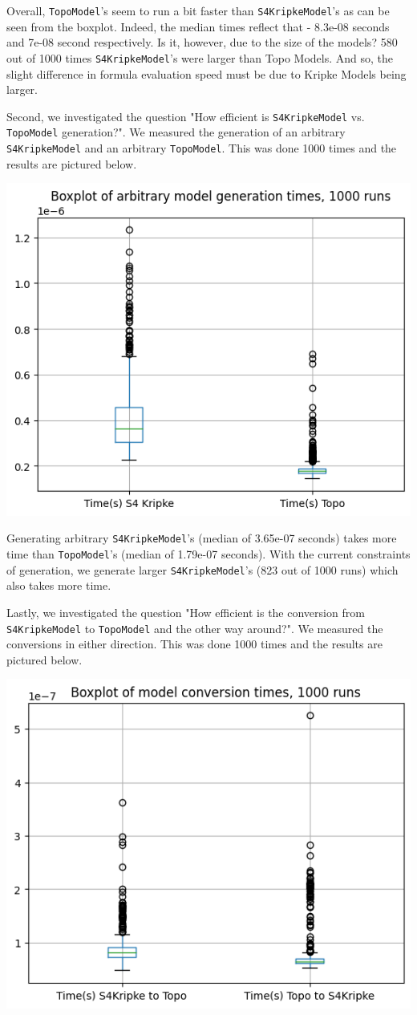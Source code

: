 \documentclass[12pt,a4paper]{article}
\begin{document}
Overall, \verb|TopoModel|'s seem to run a bit faster than \verb|S4KripkeModel|'s as can be seen from the boxplot.
Indeed, the median times reflect that - 8.3e-08 seconds and 7e-08 second respectively.
Is it, however, due to the size of the models? 580 out of 1000 times \verb|S4KripkeModel|'s were larger
than Topo Models. And so, the slight difference in formula evaluation speed must be due to
Kripke Models being larger.

Second, we investigated the question "How efficient is \verb|S4KripkeModel| vs. \verb|TopoModel| generation?".
We measured the generation of an arbitrary \verb|S4KripkeModel| and an arbitrary \verb|TopoModel|.
This was done 1000 times and the results are pictured below.

\begin{center}
\includegraphics*[width=0.5\linewidth]{bench-model-generation.png}
\end{center}

Generating arbitrary \verb|S4KripkeModel|'s (median of 3.65e-07 seconds) takes more time than \verb|TopoModel|'s
(median of 1.79e-07 seconds). With the current constraints of generation, we generate larger
\verb|S4KripkeModel|'s (823 out of 1000 runs) which also takes more time.

Lastly, we investigated the question "How efficient is the conversion from \verb|S4KripkeModel| to \verb|TopoModel|
and the other way around?". We measured the conversions in either direction.
This was done 1000 times and the results are pictured below.

\begin{center}
\includegraphics*[width=0.5\linewidth]{bench-model-conversion.png}
\end{center}
\end{document}
